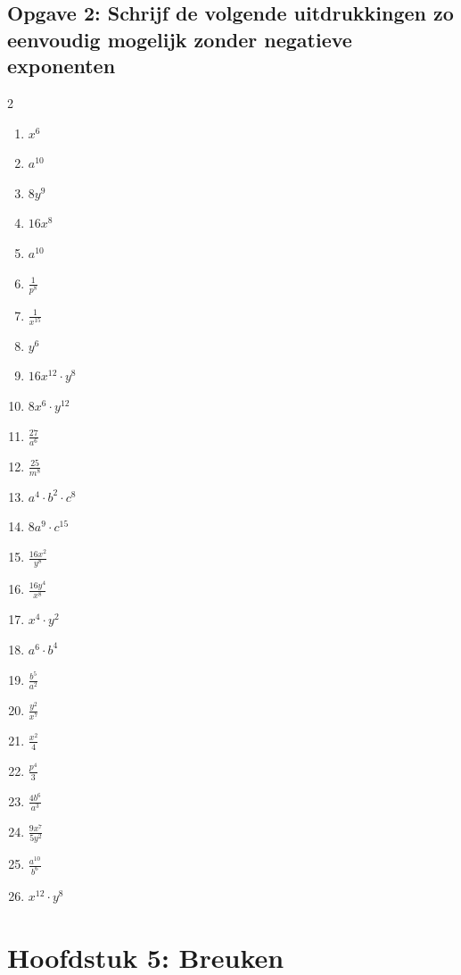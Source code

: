 \subsection*{Opgave 2: Schrijf de volgende uitdrukkingen zo eenvoudig mogelijk zonder negatieve exponenten}
\begin{multicols}{2}
\begin{enumerate}[label=\alph*)]
    \item $x^6$
    \item $a^{10}$
    \item $8y^9$
    \item $16x^8$
    \item $a^{10}$
    \item $\frac{1}{p^8}$
    \item $\frac{1}{x^{15}}$
    \item $y^6$
    \item $16x^{12} \cdot y^8$
    \item $8x^6 \cdot y^{12}$
    \item $\frac{27}{a^6}$
    \item $\frac{25}{m^8}$
    \item $a^4 \cdot b^2 \cdot c^8$
    \item $8a^9 \cdot c^{15}$
    \item $\frac{16x^2}{y^8}$
    \item $\frac{16y^4}{x^8}$
    \item $x^4 \cdot y^2$
    \item $a^6 \cdot b^4$
    \item $\frac{b^5}{a^2}$
    \item $\frac{y^2}{x^7}$
    \item $\frac{x^2}{4}$
    \item $\frac{p^4}{3}$
    \item $\frac{4b^6}{a^3}$
    \item $\frac{9x^7}{5y^2}$
    \item $\frac{a^{10}}{b^6}$
    \item $x^{12} \cdot y^8$
\end{enumerate}
\end{multicols}


\newpage
\section{Hoofdstuk 5: Breuken}
